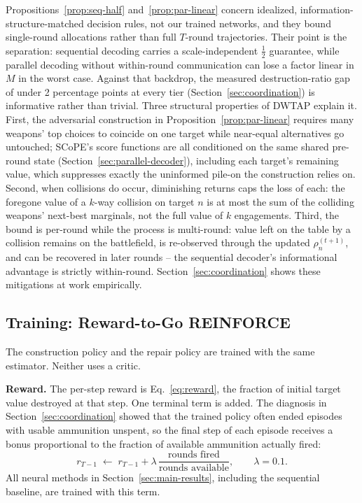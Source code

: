 \begin{remark}
\label{rem:gap-interpretation}
Propositions~\ref{prop:seq-half} and~\ref{prop:par-linear} concern idealized, information-structure-matched decision rules, not our trained networks, and they bound single-round allocations rather than full $T$-round trajectories. Their point is the separation: sequential decoding carries a scale-independent $\tfrac12$ guarantee, while parallel decoding without within-round communication can lose a factor linear in $M$ in the worst case. Against that backdrop, the measured destruction-ratio gap of under 2 percentage points at every tier (Section~\ref{sec:coordination}) is informative rather than trivial. Three structural properties of DWTAP explain it. First, the adversarial construction in Proposition~\ref{prop:par-linear} requires many weapons' top choices to coincide on one target while near-equal alternatives go untouched; SCoPE's score functions are all conditioned on the same shared pre-round state (Section~\ref{sec:parallel-decoder}), including each target's remaining value, which suppresses exactly the uninformed pile-on the construction relies on. Second, when collisions do occur, diminishing returns caps the loss of each: the foregone value of a $k$-way collision on target $n$ is at most the sum of the colliding weapons' next-best marginals, not the full value of $k$ engagements. Third, the bound is per-round while the process is multi-round: value left on the table by a collision remains on the battlefield, is re-observed through the updated $\rho_n^{(t+1)}$, and can be recovered in later rounds -- the sequential decoder's informational advantage is strictly within-round. Section~\ref{sec:coordination} shows these mitigations at work empirically.
\end{remark}

\subsection{Training: Reward-to-Go REINFORCE}
\label{sec:training}

The construction policy and the repair policy are trained with the same estimator. Neither uses a critic.

\textbf{Reward.} The per-step reward is Eq.~\eqref{eq:reward}, the fraction of initial target value destroyed at that step. One terminal term is added. The diagnosis in Section~\ref{sec:coordination} showed that the trained policy often ended episodes with usable ammunition unspent, so the final step of each episode receives a bonus proportional to the fraction of available ammunition actually fired:
\begin{equation}
\label{eq:ammo-bonus}
r_{T-1} \;\leftarrow\; r_{T-1} + \lambda\,\frac{\text{rounds fired}}{\text{rounds available}}, \qquad \lambda = 0.1.
\end{equation}
All neural methods in Section~\ref{sec:main-results}, including the sequential baseline, are trained with this term.

